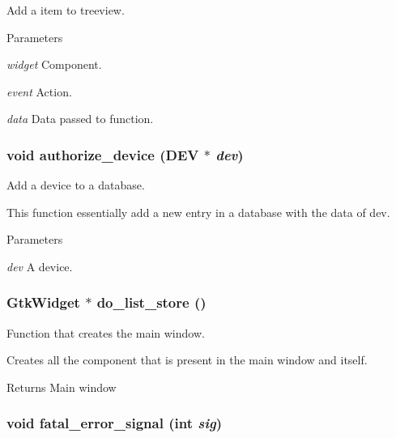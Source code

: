 Add a item to treeview. 


\begin{DoxyParams}{Parameters}
\item[{\em widget}]Component. \item[{\em event}]Action. \item[{\em data}]Data passed to function. \end{DoxyParams}
\hypertarget{usb-gui_8c_a36cb198a8cc3b38c2ee2cd9f50b97d67}{
\subsubsection[{authorize\_\-device}]{\setlength{\rightskip}{0pt plus 5cm}void authorize\_\-device ({\bf DEV} $\ast$ {\em dev})}}
\label{usb-gui_8c_a36cb198a8cc3b38c2ee2cd9f50b97d67}


Add a device to a database. 

This function essentially add a new entry in a database with the data of dev. 
\begin{DoxyParams}{Parameters}
\item[{\em dev}]A device. \end{DoxyParams}
\hypertarget{usb-gui_8c_a9ebf0061334dc756aae09069c0e2722d}{
\subsubsection[{do\_\-list\_\-store}]{\setlength{\rightskip}{0pt plus 5cm}GtkWidget $\ast$ do\_\-list\_\-store ()}}
\label{usb-gui_8c_a9ebf0061334dc756aae09069c0e2722d}


Function that creates the main window. 

Creates all the component that is present in the main window and itself. \begin{DoxyReturn}{Returns}
Main window 
\end{DoxyReturn}
\hypertarget{usb-gui_8c_ad870b459afa4a0b65382e4bb1a57ae10}{
\subsubsection[{fatal\_\-error\_\-signal}]{\setlength{\rightskip}{0pt plus 5cm}void fatal\_\-error\_\-signal (int {\em sig})}}
\label{usb-gui_8c_ad870b459afa4a0b65382e4bb1a57ae10}


